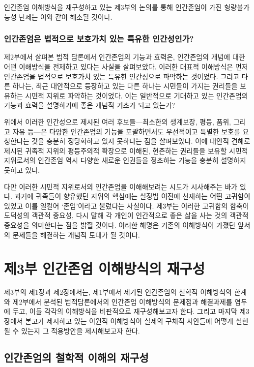 인간존엄 이해방식을 재구성하고 있는 제3부의 논의를 통해 인간존엄이 가진 형량불가능성 난제는 이와 같이 해소될 것이다.

\subsubsection{인간존엄은 법적으로 보호가치 있는 특유한 인간성인가?}

제2부에서 살펴본 법적 담론에서 인간존엄의 기능과 효력은, 인간존엄의 개념에 대한 어떤 이해방식을 전제하고 있다는 사실을 살펴보았다. 이러한 대표적 이해방식은 먼저 인간존엄을 법적으로 보호가치 있는 특유한 인간성으로 파악하는 것이었다. 그리고 다른 하나는, 최근 대안적으로 등장하고 있는 다른 하나는 시민들이 가지는 권리들을 보유하는 시민적 지위로 파악하는 것이었다. 이는 일반적으로 기대하고 있는 인간존엄의 기능과 효력을 설명하기에 좋은 개념적 기초가 되고 있는가?

위에서 이러한 인간성으로 제시된 여러 후보들---최소한의 생계보장, 평등, 품위, 그리고 자유 등---은 다양한 인간존엄의 기능을 포괄하면서도 우선적이고 특별한 보호를 요청한다는 것을 충분히 정당화하고 있지 못하다는 점을 살펴보았다. 이에 대안적 견해로 제시된 귀족적 지위의 평등주의적 확장으로 이해된, 현존하는 권리들을 보유할 시민적 지위로서의 인간존엄 역시 다양한 새로운 인권들을 정초하는 기능을 충분히 설명하지 못하고 있다.

다만 이러한 시민적 지위로서의 인간존엄을 이해해보려는 시도가 시사해주는 바가 있다. 과거에 귀족들이 향유했던 지위의 핵심에는 실정법 이전에 선재하는 어떤 고귀함이 있었고 이를 일컬어 `존엄'이라고 불렀다는 사실이다. 제3부는 이러한 고귀함의 함축이 도덕성의 객관적 중요성, 다시 말해 각 개인이 인간적으로 좋은 삶을 사는 것의 객관적 중요성을 의미한다는 점을 밝힐 것이다. 이러한 해명은 기존의 이해방식이 가졌던 앞서의 문제들을 해결하는 개념적 토대가 될 것이다.

\section{제3부 인간존엄 이해방식의 재구성}

제3부의 제1장과 제2장에서는, 제1부에서 제기된 인간존엄의 철학적 이해방식의 한계와 제2부에서 분석된 법적담론에서의 인간존엄 이해방식의 문제점과 해결과제를 염두에 두고, 이들 각각의 이해방식을 비판적으로 재구성해보고자 한다. 그리고 마지막 제3장에서 본고가 제시하고 있는 이원적 이해방식이 실제의 구체적 사안들에 어떻게 실현될 수 있는지 그 적용방안을 제시해보고자 한다.

\subsection{인간존엄의 철학적 이해의 재구성}

